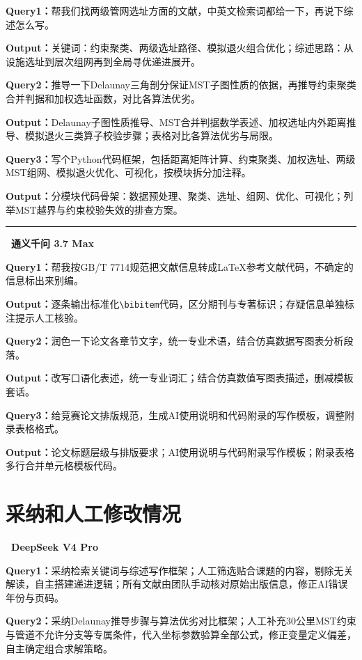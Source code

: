 \documentclass[12pt,a4paper]{ctexart}
\begin{document}
\textbf{Query1：}帮我们找两级管网选址方面的文献，中英文检索词都给一下，再说下综述怎么写。

\textbf{Output：}关键词：约束聚类、两级选址路径、模拟退火组合优化；综述思路：从设施选址到层次组网再到全局寻优递进展开。

\textbf{Query2：}推导一下Delaunay三角剖分保证MST子图性质的依据，再推导约束聚类合并判据和加权选址函数，对比各算法优劣。

\textbf{Output：}Delaunay子图性质推导、MST合并判据数学表述、加权选址内外距离推导、模拟退火三类算子校验步骤；表格对比各算法优劣与局限。

\textbf{Query3：}写个Python代码框架，包括距离矩阵计算、约束聚类、加权选址、两级MST组网、模拟退火优化、可视化，按模块拆分加注释。

\textbf{Output：}分模块代码骨架：数据预处理、聚类、选址、组网、优化、可视化；列举MST越界与约束校验失效的排查方案。

\noindent\rule{\linewidth}{0.4pt}

\noindent\textbf{\textbullet~通义千问 3.7 Max}

\textbf{Query1：}帮我按GB/T 7714规范把文献信息转成LaTeX参考文献代码，不确定的信息标出来别编。

\textbf{Output：}逐条输出标准化\verb|\bibitem|代码，区分期刊与专著标识；存疑信息单独标注提示人工核验。

\textbf{Query2：}润色一下论文各章节文字，统一专业术语，结合仿真数据写图表分析段落。

\textbf{Output：}改写口语化表述，统一专业词汇；结合仿真数值写图表描述，删减模板套话。

\textbf{Query3：}给竞赛论文排版规范，生成AI使用说明和代码附录的写作模板，调整附录表格格式。

\textbf{Output：}论文标题层级与排版要求；AI使用说明与代码附录写作模板；附录表格多行合并单元格模板代码。

\section{采纳和人工修改情况}

\noindent\textbf{\textbullet~DeepSeek V4 Pro}

\textbf{Query1：}采纳检索关键词与综述写作框架；人工筛选贴合课题的内容，剔除无关解读，自主搭建递进逻辑；所有文献由团队手动核对原始出版信息，修正AI错误年份与页码。

\textbf{Query2：}采纳Delaunay推导步骤与算法优劣对比框架；人工补充30公里MST约束与管道不允许分支等专属条件，代入坐标参数验算全部公式，修正变量定义偏差，自主确定组合求解策略。
\end{document}
